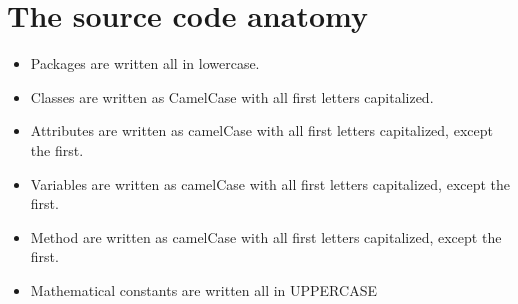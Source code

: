 \documentclass[a4paper, 12pt]{article}
\begin{document}
	\section{The source code anatomy}
	\begin{itemize}
		\item Packages are written all in lowercase.
		\item Classes are written as CamelCase with all first letters capitalized.
		\item Attributes are written as camelCase with all first letters capitalized, except the first.
		\item Variables are written as camelCase with all first letters capitalized, except the first.
		\item Method are written as camelCase with all first letters capitalized, except the first.
		\item Mathematical constants are written all in UPPERCASE 
	\end{itemize}
\end{document}
